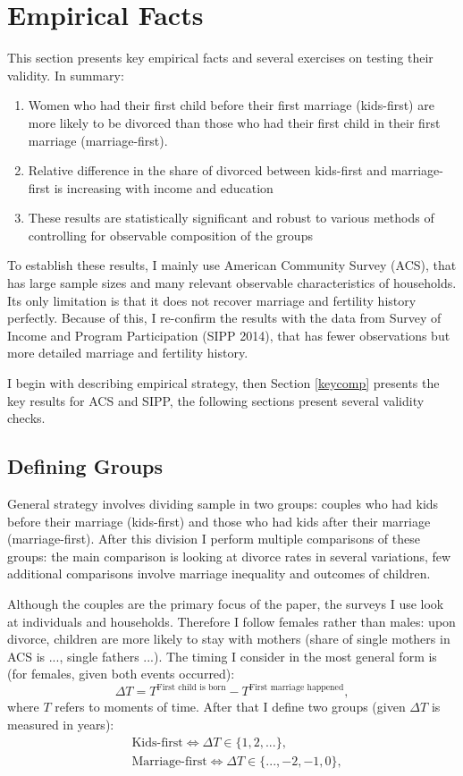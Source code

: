 \documentclass[12pt,letter]{article}
\begin{document}
\section{Empirical Facts}

This section presents key empirical facts and several exercises on testing their validity. In summary:
\begin{enumerate}
\item Women who had their first child before their first marriage (kids-first) are more likely to be divorced than those who had their first child in their first marriage (marriage-first).
\item Relative difference in the share of divorced between kids-first and marriage-first is increasing with income and education
\item These results are statistically significant and robust to various methods of controlling for observable composition of the groups
\end{enumerate}

To establish these results, I mainly use American Community Survey (ACS), that has large sample sizes and many relevant observable characteristics of households. Its only limitation is that it does not recover marriage and fertility history perfectly. Because of this, I re-confirm the results with the data from Survey of Income and Program Participation (SIPP 2014), that has fewer observations but more detailed marriage and fertility history.

I begin with describing empirical strategy, then Section \ref{keycomp} presents the key results for ACS and SIPP, the following sections present several validity checks.

\subsection{Defining Groups}

General strategy involves dividing sample in two groups: couples who had kids before their marriage (kids-first) and those who had kids after their marriage (marriage-first). After this division I perform multiple comparisons of these groups: the main comparison is looking at divorce rates in several variations, few additional comparisons involve marriage inequality and outcomes of children.

Although the couples are the primary focus of the paper, the surveys I use look at individuals and households. Therefore I follow females rather than males: upon divorce, children are more likely to stay with mothers (share of single mothers in ACS is ..., single fathers ...). The timing I consider in the  most general form is (for females, given both events occurred): 
\[\Delta T = T^{\text{First child  is born}} - T^{\text{First marriage happened}},\]
where $T$ refers to moments of time. After that I define two groups (given $\Delta T$ is measured in years):
\begin{align*}&\text{Kids-first} \Leftrightarrow \Delta T \in \{1,2,...\},\\
&\text{Marriage-first} \Leftrightarrow \Delta T \in \{...,-2,-1,0\},\end{align*}
\end{document}
